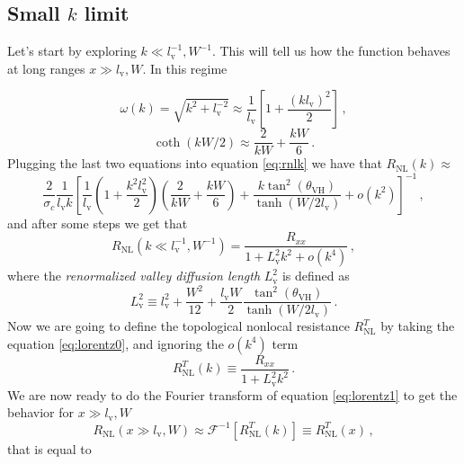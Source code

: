 \subsection{Small $k$ limit}
Let's start by exploring $k\ll l_\textrm{v}^{-1},W^{-1}$. This will tell us how the function behaves at long ranges $x\gg l_\textrm{v},W$. In this regime 

\begin{equation}
    \omega(k)=\sqrt{k^2+l_\textrm{v}^{-2}}\approx \frac 1{l_\textrm{v}}\left[1+\frac{(kl_\textrm{v})^2}2\right]\,,
\end{equation}
\begin{equation}
    \coth (kW/2)\approx \frac 2{kW} + \frac{kW}6\,.
\end{equation}
Plugging the last two equations into equation \ref{eq:rnlk} we have that $R_{\textrm{NL}}(k)\approx$
\begin{equation}
    \frac 2{\sigma_c}\frac 1 {l_\textrm{v}k}\left[
        \frac 1{l_\textrm{v}}\left(1+\frac{k^2l_\textrm{v}^2}{2}\right)\left(\frac 2{kW} + \frac{kW}6\right)+
        \frac{k\tan^2(\theta_{\textrm{VH}})}{\tanh(W/2l_\textrm{v})} + o(k^2)
    \right]^{-1}\,,
\end{equation}
and after some steps we get that
\begin{equation}
    R_{\textrm{NL}}(k\ll l_\textrm{v}^{-1},W^{-1})=
    \frac {R_{xx}}{1+L_\textrm{v}^2k^2 + o(k^4)}
    \label{eq:lorentz0}\,,
\end{equation}
where the \textit{renormalized valley diffusion length} $L_\textrm{v}^2$ is defined as
\begin{equation}
    L_\textrm{v}^2 \equiv l_\textrm{v}^2+\frac {W^2}{12} +\frac{l_\textrm{v}W}2 \frac{\tan^2(\theta_{\textrm{VH}})}{\tanh(W/2l_\textrm{v})}\,.
\end{equation}
Now we are going to define the topological nonlocal resistance $R_{\textrm{NL}}^T$ by taking the equation \ref{eq:lorentz0}, and ignoring the $o(k^4)$ term
\begin{equation}
    R_{\textrm{NL}}^T(k)\equiv
    \frac {R_{xx}}{1+L_\textrm{v}^2k^2}\,.
    \label{eq:lorentz1}
\end{equation} 
We are now ready to do the Fourier transform of equation \ref{eq:lorentz1} to get the behavior for $x\gg l_\textrm{v},W$
\begin{equation}
    R_{\textrm{NL}}(x\gg l_\textrm{v},W)\approx\mathcal F^{-1}\left[R_{\textrm{NL}}^T(k)\right]\equiv R_{\textrm{NL}}^T(x)\,,
\end{equation}
that is equal to 


